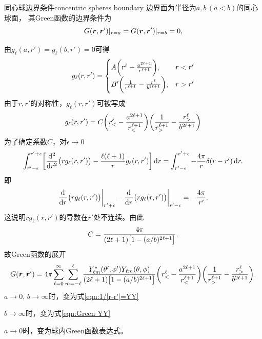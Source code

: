 \begin{example}{同心球边界条件}{concentric spheres boundary}
    边界面为半径为$a,b\,(a < b)$的同心球面，
    其Green函数的边界条件为
    \[
        \eval{G(\bm r,\bm r')}_{r=a} = \eval{G(\bm r,\bm r')}_{r=b} = 0,
    \]
    \begin{notecaptionblock}
        \label{fig:concentric spheres boundary}
    \end{notecaptionblock}
    由$g_\ell(a,r') = g_\ell(b,r') = 0$可得
    \[
        g_\ell(r,r') =
        \begin{cases}
            A\biggp{r^\ell - \frac{a^{2\ell+1}}{r^{\ell+1}}},&r < r'\\
            B'\biggp{\frac1{r^{\ell+1}} - \frac{r^\ell}{b^{2\ell+1}}},&r > r'\\
        \end{cases}
    \]
    由于$r,r'$的对称性，$g_\ell(r,r')$可被写成 
    \[
        g_\ell(r,r') = C\biggp{r_<^\ell - \frac{a^{2\ell+1}}{r_<^{\ell+1}}}\biggp{\frac1{r_>^{\ell+1}} - \frac{r_>^\ell}{b^{2\ell+1}}}
    \]
    为了确定系数$C$，对$\epsilon \to 0$
    \[
        \int_{r'-\epsilon}^{r'+\epsilon}\biggb{\dd[2]r\bigp{rg_\ell(r,r')} - \frac{\ell(\ell + 1)}{r}g_\ell(r,r')}\d r = \int_{r'-\epsilon}^{r'+\epsilon} - \frac{4\pi}r\delta(r - r')\d r.
    \]
    即
    \begin{equation}
        \label{eq:ed-spherical-green-derivative-jump}
        \biggeval{\dd r\bigp{rg_\ell(r,r')}}_{r'+\epsilon} - \biggeval{\dd r\bigp{rg_\ell(r,r')}}_{r'-\epsilon} = -\frac{4\pi}{r'}.
    \end{equation}
    这说明$rg_\ell(r,r')$的导数在$r'$处不连续。由此
    \[
        C = \frac{4\pi}{(2\ell + 1)\bigb{1 - (a/b)^{2\ell+1}}}.
    \]
    故Green函数的展开
    \begin{equation}
        G(\bm r,\bm r') = 4\pi\sum_{\ell=0}^\infty\sum_{m=-\ell}^\ell \frac{Y_{\ell m}\conj(\theta',\phi')Y_{\ell m}(\theta,\phi)}{(2\ell + 1)\bigb{1 - (a/b)^{2\ell+1}}}\biggp{r_<^\ell - \frac{a^{2\ell+1}}{r_<^{\ell+1}}}\biggp{\frac1{r_>^{\ell+1}} - \frac{r_>^\ell}{b^{2\ell+1}}}.
    \end{equation}
    \tcblower
    $a \to 0,\,b \to \infty$时，变为式\eqref{eqn:1/|r-r'|=YY}

    $b \to \infty$时，变为式\eqref{eqn:Green YY}
    
    $a \to 0$时，变为球内Green函数表达式。
\end{example}

